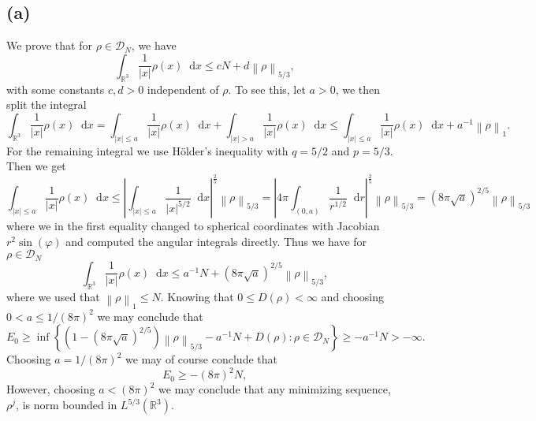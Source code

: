 \documentclass[a4paper,11pt]{article}
\newcommand{\norm}[1]{\left\lVert #1 \right\rVert}
\newcommand{\abs}[1]{\left\lvert #1 \right\rvert}
\newcommand*\diff{\mathop{}\!\mathrm{d}}
\newcommand{\R}{\mathbb{R}}
\numberwithin{equation}{section}
\begin{document}
\subsection*{(a)}
We prove that for $ \rho\in \mathcal{D}_N $, we have\begin{equation}
\int_{\R^3}\frac{1}{\abs{x}}\rho(x)\diff x\leq cN+d\norm{\rho}_{5/3},
\end{equation}
with some constants $ c,d>0 $ independent of $ \rho $. To see this, let $a>0$, we then split the integral \begin{equation}
\int_{\R^3}\frac{1}{\abs{x}}\rho(x)\diff x=\int_{\abs{x}\leq a}\frac{1}{\abs{x}}\rho(x)\diff x+\int_{\abs{x}>a}\frac{1}{\abs{x}}\rho(x)\diff x\leq\int_{\abs{x}\leq a}\frac{1}{\abs{x}}\rho(x)\diff x+a^{-1}\norm{\rho}_1.
\end{equation}
For the remaining integral we use H\"older's inequality with $ q=5/2 $  and $ p=5/3 $. Then we get \begin{equation}
\int_{\abs{x}\leq a}\frac{1}{\abs{x}}\rho(x)\diff x\leq\abs{\int_{\abs{x}\leq a}\frac{1}{\abs{x}^{5/2}}\diff x}^{\frac{2}{5}}\norm{\rho}_{5/3}=\abs{4\pi \int_{(0,a)}\frac{1}{r^{1/2}}\diff r}^{\frac{2}{5}}\norm{\rho}_{5/3}=(8\pi\sqrt{a})^{2/5}\norm{\rho}_{5/3}
\end{equation}
where we in the first equality changed to spherical coordinates with Jacobian $ r^2\sin(\varphi) $ and computed the angular integrals directly. Thus we have for $ \rho\in \mathcal{D}_N $ \begin{equation}
\int_{\R^3}\frac{1}{\abs{x}}\rho(x)\diff x\leq a^{-1}N+(8\pi\sqrt{a})^{2/5}\norm{\rho}_{5/3},
\end{equation}
where we used that $ \norm{\rho}_1\leq N $.
Knowing that $ 0\leq D(\rho)<\infty $ and choosing $ 0<a\leq 1/(8\pi)^2 $ we may conclude that \begin{equation}
E_0\geq\inf\left\{(1-(8\pi\sqrt{a})^{2/5})\norm{\rho}_{5/3}-a^{-1}N+D(\rho) : \rho\in\mathcal{D}_N\right\}\geq-a^{-1}N>-\infty.
\end{equation}
Choosing $ a=1/(8\pi)^2 $ we may of course conclude that \begin{equation}
E_0\geq-(8\pi)^2N,
\end{equation}
However, choosing $ a<(8\pi)^2 $ we may conclude that any minimizing sequence, $ \rho^j $, is norm bounded in $ L^{5/3}(\R^3) $. 
\end{document}
